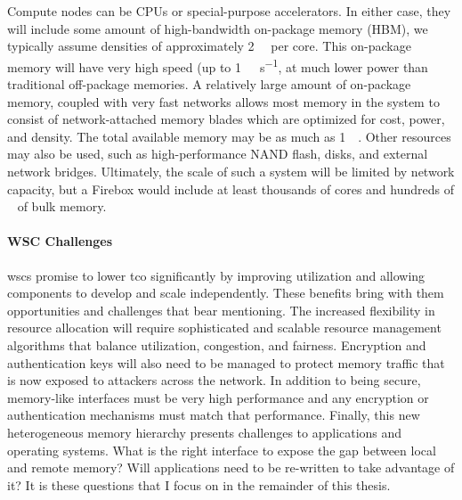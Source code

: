 Compute nodes can be CPUs or special-purpose accelerators. In either case, they
will include some amount of high-bandwidth on-package memory (HBM), we
typically assume densities of approximately \SI{2}{\giga\byte} per core. This
on-package memory will have very high speed (up to
\SI{1}{\tera\byte\per\second}, at much lower power than traditional off-package
memories. A relatively large amount of on-package memory, coupled with very
fast networks allows most memory in the system to consist of network-attached memory
blades which are optimized for cost, power, and density. The total available
memory may be as much as \SI{1}{\peta\byte}. Other resources may also be used,
such as high-performance NAND flash, disks, and external network bridges.
Ultimately, the scale of such a system will be limited by network capacity, but
a Firebox would include at least thousands of cores and hundreds of
\si{\tera\byte} of bulk memory.

\paragraph{WSC Challenges} \Glspl{wsc} promise to lower \gls{tco} significantly
by improving utilization and allowing components to develop and scale
independently. These benefits bring with them opportunities and challenges that
bear mentioning. The increased flexibility in resource allocation will require
sophisticated and scalable resource management algorithms that balance
utilization, congestion, and fairness. Encryption and authentication keys will
also need to be managed to protect memory traffic that is now exposed to
attackers across the network. In addition to being secure, memory-like
interfaces must be very high performance and any encryption or authentication
mechanisms must match that performance.  Finally, this new heterogeneous memory
hierarchy presents challenges to applications and operating systems. What is
the right interface to expose the gap between local and remote memory? Will
applications need to be re-written to take advantage of it? It is these
questions that I focus on in the remainder of this thesis.

